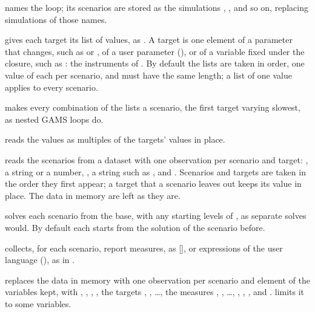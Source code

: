 \begin{optdesc}
\item[\optarg{}{name}{name}] names the loop; its scenarios are stored as the
simulations , , and so on, replacing
simulations of those names.

\item[\optarg{val}{ues}{spec}] gives each target its list of values, as
. A target is
one element of a parameter that  changes, such as
 or , of a user parameter (),
or of a variable fixed under the closure, such as : the
instruments of . By default the lists are taken in order,
one value of each per scenario, and must have the same length; a list of one
value applies to every scenario.

\item[\opt{}{grid}] makes every combination of the lists a scenario, the first
target varying slowest, as nested GAMS loops do.

\item[\opt{sc}{ale}] reads the values as multiples of the targets' values in
place.

\item[\cmd{using} \argu{filename}] reads the scenarios from a dataset with one
observation per scenario and target: , a string or a number,
, a string such as , and . Scenarios
and targets are taken in the order they first appear; a target that a
scenario leaves out keeps its value in place. The data in memory are left as
they are.

\item[\opt{}{cold}] solves each scenario from the base, with any starting
levels of , as separate solves would. By default each starts
from the solution of the scenario before.

\item[\optarg{meas}{ures}{list}] collects, for each scenario, report measures,
as  [], or expressions of the user language
(), as in .

\item[\opt{}{clear}] replaces the data in memory with one observation per
scenario and element of the variables kept, with , ,
, , the targets , , \dots, the measures
, , \dots, , , ,
 and .  limits it to some
variables.


\end{optdesc}
